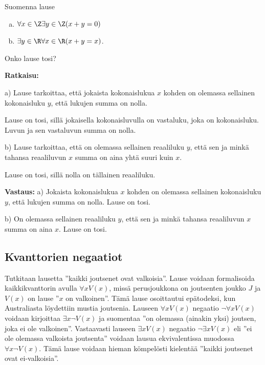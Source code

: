 \begin{esimerkki}
Suomenna lause
\begin{enumerate}[a)]
\item $\forall x\in \Z\exists y\in \Z (x+y=0)$
\item $\exists y\in \R\forall x\in \R (x+y =x)$.
\end{enumerate}
Onko lause tosi?

{\bf Ratkaisu:}

a) Lause tarkoittaa, että jokaista kokonaislukua $x$ kohden on
olemassa sellainen kokonaisluku $y$, että lukujen summa on nolla.

Lause on tosi, sillä jokaisella kokonaisluvulla on vastaluku,
joka on kokonaisluku. Luvun ja sen vastaluvun summa on nolla.

b) Lause tarkoittaa, että on olemassa sellainen reaaliluku $y$,
että sen ja minkä tahansa reaaliluvun $x$ summa on aina yhtä
suuri kuin $x$.

Lause on tosi, sillä nolla on tällainen reaaliluku.

{\bf Vastaus:} a) Jokaista kokonaislukua $x$ kohden on olemassa
sellainen kokonaisluku $y$, että lukujen summa on nolla. Lause on
tosi.

b) On olemassa sellainen reaaliluku $y$, että sen ja minkä
tahansa reaaliluvun $x$ summa on aina $x$. Lause on tosi.
\end{esimerkki}

\subsection*{Kvanttorien negaatiot} Tutkitaan lausetta ''kaikki joutsenet ovat valkoisia''. Lause voidaan formalisoida kaikkikvanttorin avulla $\forall x V(x)$, missä perusjoukkona on joutsenten joukko $J$ ja $V(x)$ on lause ''$x$ on valkoinen''. Tämä lause osoittautui epätodeksi, kun Australiasta löydettiin mustia joutsenia. Lauseen $\forall x V(x)$ negaatio $\lnot \forall x V(x)$ voidaan kirjoittaa $\exists x \lnot V(x)$ ja suomentaa ''on olemassa (ainakin yksi) joutsen, joka ei ole valkoinen''. Vastaavasti lauseen $\exists x V(x)$ negaatio $\lnot \exists x V(x)$ eli ''ei ole olemassa valkoista joutsenta'' voidaan lausua ekvivalentissa muodossa $\forall x \lnot V(x)$. Tämä lause voidaan hieman kömpelösti kielentää ''kaikki joutsenet ovat ei-valkoisia''.


